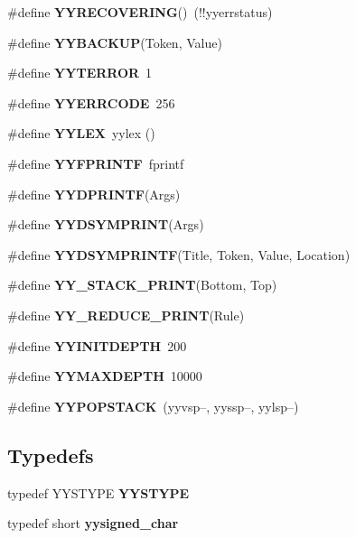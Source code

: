 \begin{CompactItemize}
\item 
\#define {\bf YYRECOVERING}()\ (!!yyerrstatus)
\item 
\#define {\bf YYBACKUP}(Token, Value)
\item 
\#define {\bf YYTERROR}\ 1
\item 
\#define {\bf YYERRCODE}\ 256
\item 
\#define {\bf YYLEX}\ yylex ()
\item 
\#define {\bf YYFPRINTF}\ fprintf
\item 
\#define {\bf YYDPRINTF}(Args)
\item 
\#define {\bf YYDSYMPRINT}(Args)
\item 
\#define {\bf YYDSYMPRINTF}(Title, Token, Value, Location)
\item 
\#define {\bf YY\_\-STACK\_\-PRINT}(Bottom, Top)
\item 
\#define {\bf YY\_\-REDUCE\_\-PRINT}(Rule)
\item 
\#define {\bf YYINITDEPTH}\ 200
\item 
\#define {\bf YYMAXDEPTH}\ 10000
\item 
\#define {\bf YYPOPSTACK}\ (yyvsp--, yyssp--, yylsp--)
\end{CompactItemize}
\subsection*{Typedefs}
\begin{CompactItemize}
\item 
typedef YYSTYPE {\bf YYSTYPE}
\item 
typedef short {\bf yysigned\_\-char}
\end{CompactItemize}
